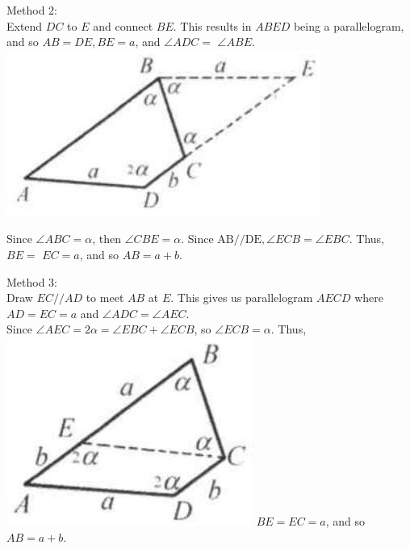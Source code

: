 \documentclass{article}
\begin{document}
Method 2:\\
Extend \(D C\) to \(E\) and connect \(B E\). This results in \(A B E D\) being a parallelogram, and so \(A B=D E, B E=a\), and \(\angle A D C=\) \(\angle A B E\).\\
\centering
\includegraphics[width=\textwidth]{images/110(1).jpg}


Since \(\angle A B C=\alpha\), then \(\angle C B E=\alpha\). Since \(\mathrm{AB} / / \mathrm{DE}, \angle E C B=\angle E B C\). Thus, \(B E=\) \(E C=a\), and so \(A B=a+b\).

Method 3:\\
Draw \(E C / / A D\) to meet \(A B\) at \(E\). This gives us parallelogram \(A E C D\) where \(A D=E C=a\) and \(\angle A D C=\angle A E C\).\\
Since \(\angle A E C=2 \alpha=\angle E B C+\angle E C B\), so \(\angle E C B=\alpha\). Thus,\\
\includegraphics[width=\textwidth]{images/111.jpg} \(B E=E C=a\), and so \(A B=a+b\).
\end{document}
